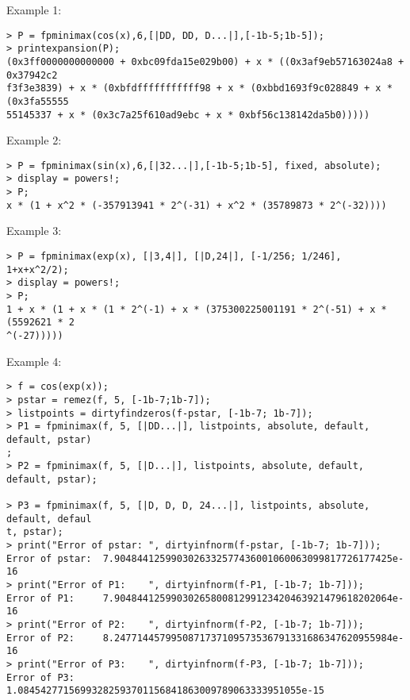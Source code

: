 \noindent Example 1: 
\begin{center}\begin{minipage}{15cm}\begin{Verbatim}[frame=single]
> P = fpminimax(cos(x),6,[|DD, DD, D...|],[-1b-5;1b-5]);
> printexpansion(P);
(0x3ff0000000000000 + 0xbc09fda15e029b00) + x * ((0x3af9eb57163024a8 + 0x37942c2
f3f3e3839) + x * (0xbfdfffffffffff98 + x * (0xbbd1693f9c028849 + x * (0x3fa55555
55145337 + x * (0x3c7a25f610ad9ebc + x * 0xbf56c138142da5b0)))))
\end{Verbatim}
\end{minipage}\end{center}
\noindent Example 2: 
\begin{center}\begin{minipage}{15cm}\begin{Verbatim}[frame=single]
> P = fpminimax(sin(x),6,[|32...|],[-1b-5;1b-5], fixed, absolute);
> display = powers!;
> P;
x * (1 + x^2 * (-357913941 * 2^(-31) + x^2 * (35789873 * 2^(-32))))
\end{Verbatim}
\end{minipage}\end{center}
\noindent Example 3: 
\begin{center}\begin{minipage}{15cm}\begin{Verbatim}[frame=single]
> P = fpminimax(exp(x), [|3,4|], [|D,24|], [-1/256; 1/246], 1+x+x^2/2);
> display = powers!;
> P;
1 + x * (1 + x * (1 * 2^(-1) + x * (375300225001191 * 2^(-51) + x * (5592621 * 2
^(-27)))))
\end{Verbatim}
\end{minipage}\end{center}
\noindent Example 4: 
\begin{center}\begin{minipage}{15cm}\begin{Verbatim}[frame=single]
> f = cos(exp(x));
> pstar = remez(f, 5, [-1b-7;1b-7]);
> listpoints = dirtyfindzeros(f-pstar, [-1b-7; 1b-7]);
> P1 = fpminimax(f, 5, [|DD...|], listpoints, absolute, default, default, pstar)
;
> P2 = fpminimax(f, 5, [|D...|], listpoints, absolute, default, default, pstar);

> P3 = fpminimax(f, 5, [|D, D, D, 24...|], listpoints, absolute, default, defaul
t, pstar);
> print("Error of pstar: ", dirtyinfnorm(f-pstar, [-1b-7; 1b-7]));
Error of pstar:  7.9048441259903026332577436001060063099817726177425e-16
> print("Error of P1:    ", dirtyinfnorm(f-P1, [-1b-7; 1b-7]));
Error of P1:     7.9048441259903026580081299123420463921479618202064e-16
> print("Error of P2:    ", dirtyinfnorm(f-P2, [-1b-7; 1b-7]));
Error of P2:     8.2477144579950871737109573536791331686347620955984e-16
> print("Error of P3:    ", dirtyinfnorm(f-P3, [-1b-7; 1b-7]));
Error of P3:     1.08454277156993282593701156841863009789063333951055e-15
\end{Verbatim}
\end{minipage}\end{center}
